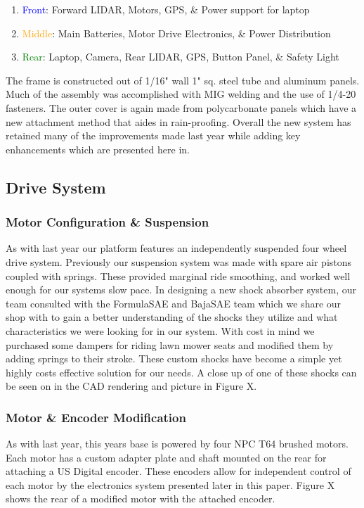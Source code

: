 \begin{enumerate}
\item \textcolor{blue}{Front}: Forward LIDAR, Motors, GPS, \& Power support for laptop
\item \textcolor{Orange}{Middle}: Main Batteries, Motor Drive Electronics, \& Power Distribution
\item \textcolor{green}{Rear}: Laptop, Camera, Rear LIDAR, GPS, Button Panel, \& Safety Light
\end{enumerate}

The frame is constructed out of 1/16" wall 1" sq. steel tube and aluminum panels. Much of the assembly was accomplished with MIG welding and the use of 1/4-20 fasteners. The outer cover is again made from polycarbonate panels which have a new attachment method that aides in rain-proofing. Overall the new system has retained many of the improvements made last year while adding key enhancements which are presented here in. 

\subsection{Drive System}
\subsubsection{Motor Configuration \& Suspension}
As with last year our platform features an independently suspended four wheel drive system. Previously our suspension system was made with spare air pistons coupled with springs. These provided marginal ride smoothing, and worked well enough for our systems slow pace. In designing a new shock absorber system, our team consulted with the FormulaSAE and BajaSAE team which we share our shop with to gain a better understanding of the shocks they utilize and what characteristics we were looking for in our system. With cost in mind we purchased some dampers for riding lawn mower seats and modified them by adding springs to their stroke. These custom shocks have become a simple yet highly costs effective solution for our needs. A close up of one of these shocks can be seen on in the CAD rendering and picture in Figure X.

\subsubsection{Motor \& Encoder Modification}
As with last year, this years base is powered by four NPC T64 brushed motors. Each motor has a custom adapter plate and shaft mounted on the rear for attaching a US Digital encoder. These encoders allow for independent control of each motor by the electronics system presented later in this paper. Figure X shows the rear of a modified motor with the attached encoder.

